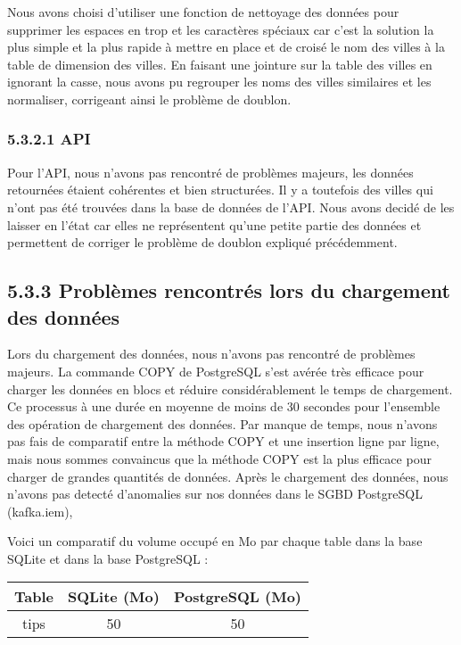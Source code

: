 \begin{itemize}
Nous avons choisi d'utiliser une fonction de nettoyage des données pour supprimer les espaces en trop et les caractères spéciaux car c'est la solution la plus simple et la plus rapide à mettre en place et de croisé le nom des villes à la table de dimension des villes.
En faisant une jointure sur la table des villes en ignorant la casse, nous avons pu regrouper les noms des villes similaires et les normaliser, corrigeant ainsi le problème de doublon.

\subsubsection{5.3.2.1 API}

Pour l'API, nous n'avons pas rencontré de problèmes majeurs, les données retournées étaient cohérentes et bien structurées.
Il y a toutefois des villes qui n'ont pas été trouvées dans la base de données de l'API.
Nous avons decidé de les laisser en l'état car elles ne représentent qu'une petite partie des données et permettent de corriger le problème de doublon expliqué précédemment.


\subsection{5.3.3 Problèmes rencontrés lors du chargement des données}

Lors du chargement des données, nous n'avons pas rencontré de problèmes majeurs.
La commande COPY de PostgreSQL s'est avérée très efficace pour charger les données en blocs et réduire considérablement le temps de chargement.
Ce processus à une durée en moyenne de moins de 30 secondes pour l'ensemble des opération de chargement des données.
Par manque de temps, nous n'avons pas fais de comparatif entre la méthode COPY et une insertion ligne par ligne, mais nous sommes convaincus que la méthode COPY est la plus efficace pour charger de grandes quantités de données.
Après le chargement des données, nous n'avons pas detecté d'anomalies sur nos données dans le SGBD PostgreSQL (kafka.iem),

Voici un comparatif du volume occupé en Mo par chaque table dans la base SQLite et dans la base PostgreSQL :

\begin{center}
\begin{tabular}{|c|c|c|}
\hline
Table & SQLite (Mo) & PostgreSQL (Mo) \\
\hline
tips & 50 & 50 \\
\hline
\end{tabular}
\end{center}



\end{itemize}
